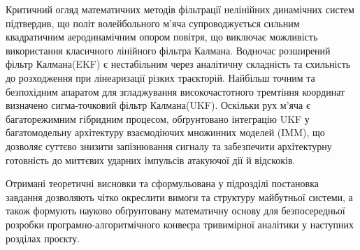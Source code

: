 \begin{unnumbered}
Критичний огляд математичних методів фільтрації нелінійних динамічних систем підтвердив, що політ волейбольного м'яча
супроводжується сильним квадратичним аеродинамічним опором повітря, що виключає можливість використання класичного
лінійного фільтра Калмана. Водночас розширений фільтр Калмана(\gls{EKF}) є нестабільним через аналітичну складність та
схильність до розходження при лінеаризації різких траєкторій. Найбільш точним та безпохідним апаратом для згладжування
високочастотного тремтіння координат визначено сигма-точковий фільтр Калмана(\gls{UKF}). Оскільки рух м'яча є багаторежимним
гібридним процесом, обґрунтовано інтеграцію \gls{UKF} у багатомодельну архітектуру взаємодіючих множинних моделей
(\gls{IMM}), що дозволяє суттєво знизити запізнювання сигналу та забезпечити архітектурну готовність до миттєвих
ударних імпульсів атакуючої дії й відскоків.

Отримані теоретичні висновки та сформульована у підрозділі постановка завдання дозволяють чітко окреслити вимоги та
структуру майбутньої системи, а також формують науково обґрунтовану математичну основу для безпосередньої розробки
програмно-алгоритмічного конвеєра тривимірної аналітики у наступних розділах проєкту.

\end{unnumbered}
